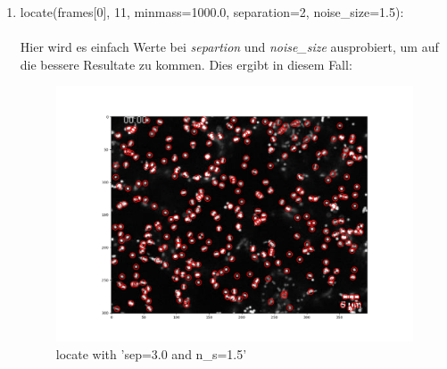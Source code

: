 \begin{enumerate}
		\item locate(frames[0], 11, minmass=1000.0, separation=2, noise\_size=1.5): \\ \\
    			Hier wird es einfach Werte bei \textit{separtion} und \textit{noise\_size} ausprobiert, um auf die bessere Resultate zu kommen. Dies ergibt in diesem Fall:
    			
\begin{figure}[H]
    \centering
    \includegraphics[scale=0.35]{Grafiken/trackpyBilder/locate_with_separation__noise_size.png}
    \caption{locate with 'sep=3.0 and n\_s=1.5'}
\end{figure}



\end{enumerate}
